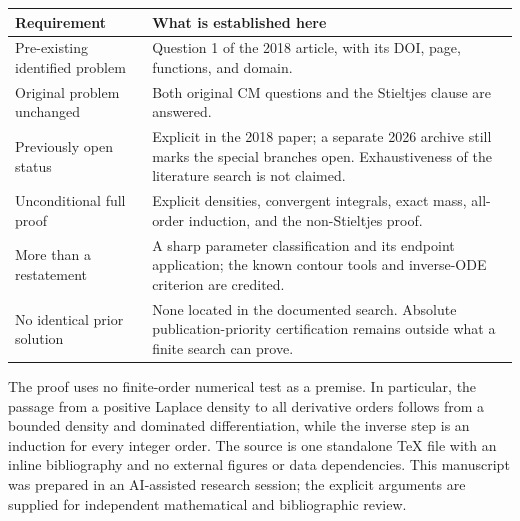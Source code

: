 \documentclass[11pt,a4paper]{article}
\theoremstyle{definition}\newtheorem{definition}[theorem]{Definition}
\theoremstyle{remark}\newtheorem{remark}[theorem]{Remark}
\begin{document}
\begin{center}
\small
\begin{tabular}{p{}p{}}
\toprule
Requirement & What is established here \\
\midrule
Pre-existing identified problem & Question 1 of the 2018 article, with its DOI, page, functions, and domain. \\
Original problem unchanged & Both original CM questions and the Stieltjes clause are answered. \\
Previously open status & Explicit in the 2018 paper; a separate 2026 archive still marks the special branches open. Exhaustiveness of the literature search is not claimed. \\
Unconditional full proof & Explicit densities, convergent integrals, exact mass, all-order induction, and the non-Stieltjes proof. \\
More than a restatement & A sharp parameter classification and its endpoint application; the known contour tools and inverse-ODE criterion are credited. \\
No identical prior solution & None located in the documented search. Absolute publication-priority certification remains outside what a finite search can prove. \\
\bottomrule
\end{tabular}
\end{center}

The proof uses no finite-order numerical test as a premise.
In particular, the passage from a positive Laplace density to all
derivative orders follows from a bounded density and dominated
differentiation, while the inverse step is an induction for every
integer order. The source is one standalone TeX file with an inline
bibliography and no external figures or data dependencies.
This manuscript was prepared in an AI-assisted research session;
the explicit arguments are supplied for independent mathematical
and bibliographic review.
\end{document}
